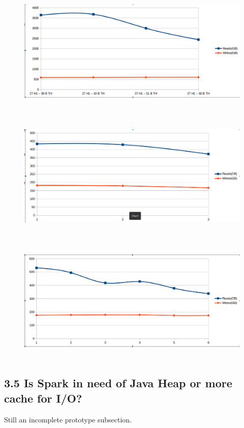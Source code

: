 \documentclass[twocolumn,10pt]{asme2e}
\begin{document}
\begin{figure}[h!]
        \includegraphics[width=12cm,height=6cm]{rw_linr_pc_th.png}
\end{figure}

\begin{figure}[h!]
        \includegraphics[width=12cm,height=6cm]{rw_pr_h1_th.png}
\end{figure}

\begin{figure}[h!]
        \includegraphics[width=12cm,height=6cm]{rw_pr_pc_th.png}
\end{figure}

\subsection*{3.5 Is Spark in need of Java Heap or more cache for I/O?}
Still an incomplete prototype subsection.
\end{document}
